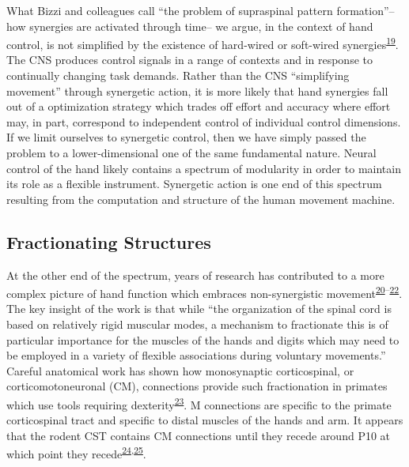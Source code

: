 \documentclass[
  a4paper,
]{article}
\begin{document}
What Bizzi and colleagues call ``the problem of supraspinal pattern
formation''--how synergies are activated through time-- we argue, in the
context of hand control, is not simplified by the existence of
hard-wired or soft-wired
synergies\textsuperscript{\protect\hyperlink{ref-bizziMotorPlanningExecution2020}{19}}.
The CNS produces control signals in a range of contexts and in response
to continually changing task demands. Rather than the CNS ``simplifying
movement'' through synergetic action, it is more likely that hand
synergies fall out of a optimization strategy which trades off effort
and accuracy where effort may, in part, correspond to independent
control of individual control dimensions. If we limit ourselves to
synergetic control, then we have simply passed the problem to a
lower-dimensional one of the same fundamental nature. Neural control of
the hand likely contains a spectrum of modularity in order to maintain
its role as a flexible instrument. Synergetic action is one end of this
spectrum resulting from the computation and structure of the human
movement machine.

\hypertarget{fractionating-structures}{%
\subsection{Fractionating Structures}\label{fractionating-structures}}

At the other end of the spectrum, years of research has contributed to a
more complex picture of hand function which embraces non-synergistic
movement\textsuperscript{\protect\hyperlink{ref-lemon1993}{20}--\protect\hyperlink{ref-lemon2008}{22}}.
The key insight of the work is that while ``the organization of the
spinal cord is based on relatively rigid muscular modes, a mechanism to
fractionate this is of particular importance for the muscles of the
hands and digits which may need to be employed in a variety of flexible
associations during voluntary movements.'' Careful anatomical work has
shown how monosynaptic corticospinal, or corticomotoneuronal (CM),
connections provide such fractionation in primates which use tools
requiring
dexterity\textsuperscript{\protect\hyperlink{ref-lemonStartingStoppingMovement2019}{23}}.
M connections are specific to the primate corticospinal tract and
specific to distal muscles of the hands and arm. It appears that the
rodent CST contains CM connections until they recede around P10 at which
point they
recede\textsuperscript{\protect\hyperlink{ref-kawasawa2017}{24},\protect\hyperlink{ref-murabe2018}{25}}.
\end{document}
